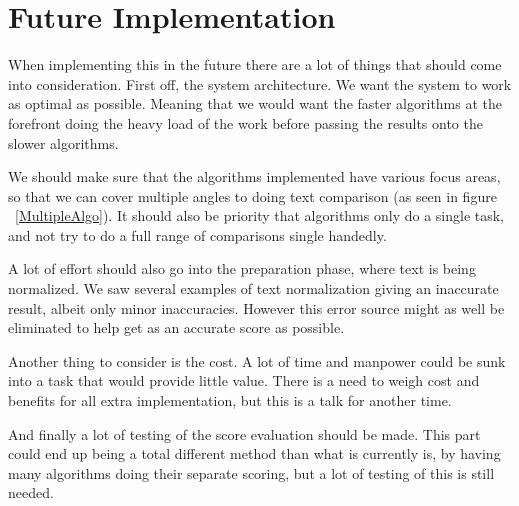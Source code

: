 \chapter{Future Implementation}
When implementing this in the future there are a lot of things that should come into consideration. First off, the system architecture. We want the system to work as optimal as possible. Meaning that we would want the faster algorithms at the forefront doing the heavy load of the work before passing the results onto the slower algorithms. 

We should make sure that the algorithms implemented have various focus areas, so that we can cover multiple angles to doing text comparison (as seen in figure ~\ref{MultipleAlgo}). It should also be priority that algorithms only do a single task, and not try to do a full range of comparisons single handedly.

A lot of effort should also go into the preparation phase, where text is being normalized. We saw several examples of text normalization giving an inaccurate result, albeit only minor inaccuracies. However this error source might as well be eliminated to help get as an accurate score as possible.

Another thing to consider is the cost. A lot of time and manpower could be sunk into a task that would provide little value. There is a need to weigh cost and benefits for all extra implementation, but this is a talk for another time.

And finally a lot of testing of the score evaluation should be made. This part could end up being a total different method than what is currently is, by having many algorithms doing their separate scoring, but a lot of testing of this is still needed.